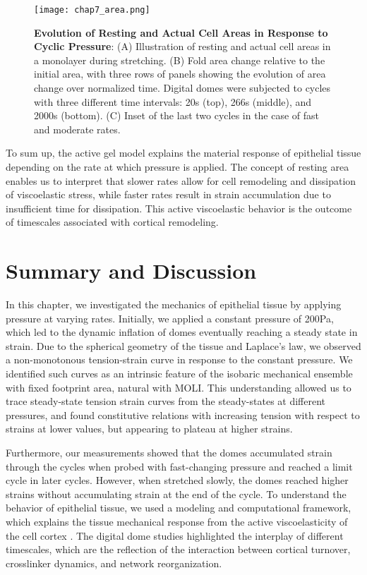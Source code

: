 \begin{figure}
	\centering
	\texttt{[image: chap7\_area.png]}
	\caption{\label{fig_7_8} \textbf{Evolution of Resting and Actual Cell Areas in Response to Cyclic Pressure}: (A) Illustration of resting and actual cell areas in a monolayer during stretching. (B) Fold area change relative to the initial area, with three rows of panels showing the evolution of area change over normalized time. Digital domes were subjected to cycles with three different time intervals: 20s (top), 266s (middle), and 2000s (bottom). (C) Inset of the last two cycles in the case of fast and moderate rates.
	}
\end{figure}

To sum up, the active gel model explains the material response of epithelial tissue depending on the rate at which pressure is applied. The concept of resting area enables us to interpret that slower rates allow for cell remodeling and dissipation of viscoelastic stress, while faster rates result in strain accumulation due to insufficient time for dissipation. This active viscoelastic behavior is the outcome of timescales associated with cortical remodeling.

\clearpage
\hypertarget{summary}{%
	\section{Summary and Discussion}\label{summary}}

In this chapter, we investigated the mechanics of epithelial tissue by applying pressure at varying rates. Initially, we applied a constant pressure of 200Pa, which led to the dynamic inflation of domes eventually reaching a steady state in strain. Due to the spherical geometry of the tissue and Laplace’s law, we observed a non-monotonous tension-strain curve in response to the constant pressure. We identified such curves as an intrinsic feature of the isobaric mechanical ensemble with fixed footprint area, natural with MOLI. This understanding allowed us to trace steady-state tension strain curves from the steady-states at different pressures, and found constitutive relations with increasing tension with respect to strains at lower values, but appearing to plateau at higher strains. 

Furthermore, our measurements showed that the domes accumulated strain through the cycles when probed with fast-changing pressure and reached a limit cycle in later cycles. However, when stretched slowly, the domes reached higher strains without accumulating strain at the end of the cycle. To understand the behavior of epithelial tissue, we used a modeling and computational framework, which explains the tissue mechanical response from the active viscoelasticity of the cell cortex \cite{ouzeri2023}. The digital dome studies highlighted the interplay of different timescales, which are the reflection of the interaction between cortical turnover, crosslinker dynamics, and network reorganization. 

